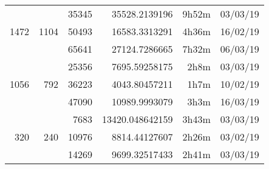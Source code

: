 \begin{center}
\begin{tabular}{ r r r | r r r }
  \hline
  \multirow{3}{*}{1472} & \multirow{3}{*}{1104} & 35345 & 35528.2139196 & 9h52m & 03/03/19 \\
  & & 50493 & 16583.3313291 & 4h36m & 16/02/19 \\
  & & 65641 & 27124.7286665 & 7h32m & 06/03/19 \\
  \hline
  \multirow{3}{*}{1056} & \multirow{3}{*}{792} & 25356 & 7695.59258175 & 2h8m & 03/03/19 \\
  & & 36223 & 4043.80457211 & 1h7m & 10/02/19 \\
  & & 47090 & 10989.9993079 & 3h3m & 16/03/19 \\
  \hline
  \multirow{3}{*}{320} & \multirow{3}{*}{240} & 7683 & 13420.048642159 & 3h43m & 03/03/19 \\
  & & 10976 & 8814.44127607 & 2h26m & 03/02/19 \\
  & & 14269 & 9699.32517433 & 2h41m & 03/03/19 \\
  \end{tabular}
  \end{center}

\newpage

